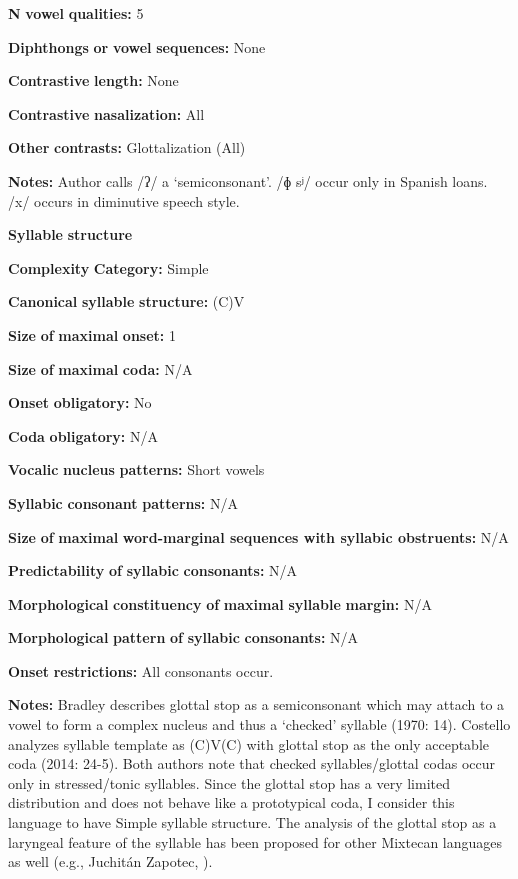 \textbf{N} \textbf{vowel} \textbf{qualities:} 5

\textbf{Diphthongs} \textbf{or} \textbf{vowel} \textbf{sequences:} None

\textbf{Contrastive} \textbf{length:} None

\textbf{Contrastive} \textbf{nasalization:} All

\textbf{Other} \textbf{contrasts:} Glottalization (All)

\textbf{Notes:} Author calls /ʔ/ a ‘semiconsonant’. /ɸ sʲ/ occur only in Spanish loans. /x/ occurs in diminutive speech style.

\textbf{Syllable} \textbf{structure}

\textbf{Complexity} \textbf{Category:} Simple

\textbf{Canonical} \textbf{syllable} \textbf{structure:} (C)V \citep[14]{Bradley1970}

\textbf{Size} \textbf{of} \textbf{maximal} \textbf{onset:} 1

\textbf{Size} \textbf{of} \textbf{maximal} \textbf{coda:} N/A

\textbf{Onset} \textbf{obligatory:} No

\textbf{Coda} \textbf{obligatory:} N/A

\textbf{Vocalic} \textbf{nucleus} \textbf{patterns:} Short vowels

\textbf{Syllabic} \textbf{consonant} \textbf{patterns:} N/A

\textbf{Size} \textbf{of} \textbf{maximal} \textbf{word{}-marginal sequences with syllabic obstruents:} N/A

\textbf{Predictability} \textbf{of} \textbf{syllabic} \textbf{consonants:} N/A

\textbf{Morphological} \textbf{constituency} \textbf{of} \textbf{maximal} \textbf{syllable} \textbf{margin:} N/A

\textbf{Morphological} \textbf{pattern} \textbf{of} \textbf{syllabic} \textbf{consonants:} N/A

\textbf{Onset} \textbf{restrictions:} All consonants occur.

\textbf{Notes:} Bradley describes glottal stop as a semiconsonant which may attach to a vowel to form a complex nucleus and thus a ‘checked’ syllable (1970: 14). Costello analyzes syllable template as (C)V(C) with glottal stop as the only acceptable coda (2014: 24-5). Both authors note that checked syllables/glottal codas occur only in stressed/tonic syllables. Since the glottal stop has a very limited distribution and does not behave like a prototypical coda, I consider this language to have Simple syllable structure. The analysis of the glottal stop as a laryngeal feature of the syllable has been proposed for other Mixtecan languages as well (e.g., Juchitán Zapotec, \citealt{MarlettPickett1987}).

